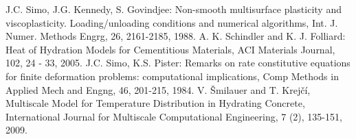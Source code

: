 \documentclass[a4paper]{article}
\begin{document}
\begin{thebibliography}{99}
 J.C. Simo, J.G. Kennedy, S. Govindjee: Non-smooth multisurface plasticity and viscoplasticity. Loading/unloading conditions and numerical algorithms, Int. J. Numer. Methods Engrg, 26, 2161-2185, 1988.
 A. K. Schindler and K. J. Folliard: Heat of Hydration Models for Cementitious Materials, ACI Materials Journal, 102, 24 - 33, 2005.
 J.C. Simo, K.S. Pister: Remarks on rate constitutive equations for finite deformation problems: computational implications, Comp Methods in Applied Mech and Engng, 46, 201-215, 1984.
 V. \v{S}milauer and T. Krej\v{c}\'i, Multiscale Model for Temperature Distribution in Hydrating Concrete, International Journal for Multiscale Computational Engineering, 7 (2), 135-151, 2009.
\end{thebibliography}
\end{document}
